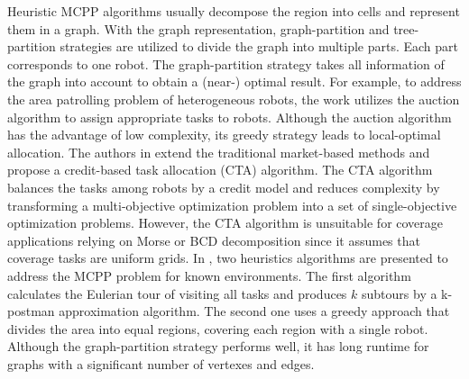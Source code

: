 \documentclass[journal,article,submit,pdftex,moreauthors]{Definitions/mdpi}
\begin{document}
Heuristic MCPP algorithms usually decompose the region into cells and represent them in a graph. With the graph representation, graph-partition and tree-partition strategies are utilized to divide the graph into multiple parts. Each part corresponds to one robot. The graph-partition strategy takes all information of the graph into account to obtain a (near-) optimal result. For example, to address the area patrolling problem of heterogeneous robots, the work \cite{c41} utilizes the auction algorithm to assign appropriate tasks to robots. Although the auction algorithm has the advantage of low complexity, its greedy strategy leads to local-optimal allocation. The authors in \cite{li2022complete} extend the traditional market-based methods and propose a credit-based task allocation (CTA) algorithm. The CTA algorithm balances the tasks among robots by a credit model and reduces complexity by transforming a multi-objective optimization problem into a set of single-objective optimization problems. However, the CTA algorithm is unsuitable for coverage applications relying on Morse or BCD decomposition since it assumes that coverage tasks are uniform grids. In \cite{c46}, two heuristics algorithms are presented to address the MCPP problem for known environments. The first algorithm calculates the Eulerian tour of visiting all tasks and produces $ k$ subtours by a k-postman approximation algorithm. The second one uses a greedy approach that divides the area into equal regions, covering each region with a single robot. Although the graph-partition strategy performs well, it has long runtime for graphs with a significant number of vertexes and edges.
\end{document}
